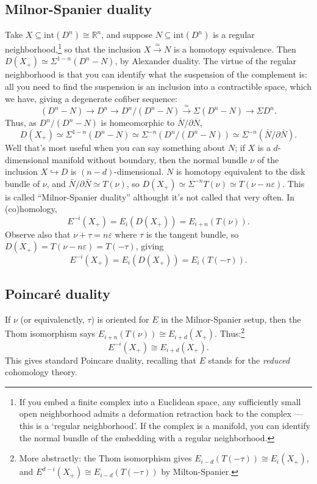 \documentclass{article}
\newcommand{\R}{\mathbb{R}}
\newcommand{\pt}[1]{#1_+}
\newcommand{\Suspend}{\Sigma}
\newcommand{\into}{\hookrightarrow}
\renewcommand{\to}{\longrightarrow}
\theoremstyle{definition}
\begin{document}
\subsection*{Milnor-Spanier duality}
Take $X \subseteq \mathrm{int}(D^n) \cong \R^n$, and suppose $N \subseteq \mathrm{int}(D^n)$ is a regular neighborhood,\footnote{If you embed a finite complex into a Euclidean space, any sufficiently small 
open neighborhood admits a deformation retraction back to the complex
 --- this is a `regular neighborhood'. If the complex is a manifold, 
you can identify the normal bundle of the embedding with a regular 
neighborhood. } so that the inclusion $X \stackrel{\simeq}{\to} N$ is a homotopy equivalence.  Then $D(\pt{X}) \simeq \Suspend^{1-n}(D^n - N)$, by Alexander duality.
The virtue of the regular neighborhood is that you can identify what the suspension of the complement is: all you need to find the suspension is an inclusion into a contractible space, which we have, giving a degenerate cofiber sequence:
\[(D^n - N) \to D^n \to D^n/(D^n - N) \overset{\simeq}{\to} \Suspend(D^n - N)\to\Sigma D^n.\]
Thus, as $D^n/(D^n-N)$ is homeomorphic to $\overline N/\partial\overline N$,
\[D(X_+)\simeq\Suspend^{1-n}(D^n - N) \simeq \Suspend^{-n}(D^n / (D^n-N)) \simeq \Suspend^{-n}(\bar N / \partial \bar N).\]  Well that's most useful when you can say something about $N$; if $X$ is a $d$-dimensional manifold without boundary, then the normal bundle $\nu$ of the inclusion $X \into D$ is $(n-d)$-dimensional.  $N$ is homotopy equivalent to the disk bundle of $\nu$, and $\bar N / \partial \bar N \simeq T (\nu)$, so $D(\pt{X}) \simeq \Suspend^{-n} T(\nu) \simeq T(\nu - n \varepsilon)$.  This is called ``Milnor-Spanier duality'' althought it's not called that very often.  In (co)homology,
\[
E^{-i}(\pt{X}) = E_i (D(\pt{X})) = E_{i+n} (T (\nu)).
\]
Observe also that $\nu + \tau = n \varepsilon$ where $\tau$ is the tangent bundle, so $D(\pt{X}) = T(\nu - n \varepsilon) = T(-\tau)$, giving
\[
E^{-i}(\pt{X}) = E_i (D(\pt{X})) = E_{i} (T (-\tau)).
\]
\subsection*{Poincar\'e duality}
If $\nu$ (or equivalenctly, $\tau$) is oriented for $E$ in the Milnor-Spanier setup, then the Thom isomorphism says $E_{i+n} (T (\nu)) \cong E_{i+d} (\pt{X})$. Thus:\footnote{More abstractly: the Thom isomorphism gives $E_{i-d}(T(-\tau))\cong E_i(X_+)$, and $E^{d-i}(X_+)\cong E_{i-d}(T(-\tau))$ by Milton-Spanier.}
\[E^{-i} (\pt{X}) \cong E_{i+d} (\pt{X}).\]
This gives standard Poincare duality, recalling that $E$ stands for the \emph{reduced} cohomology theory.
\end{document}
